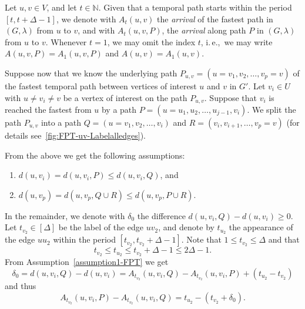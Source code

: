 \documentclass[a4paper,UKenglish,cleveref, autoref, thm-restate]{lipics-v2021}
\newcommand{\ie}{i.\,e.,\ }
\begin{document}
Let $u,v\in V$, and let $t\in \mathbb{N}$. 
Given that a temporal path starts within the period $[t,t+\Delta -1]$,
we denote with $A_{t}(u,v)$
the \emph{arrival} of the fastest path in $(G,\lambda )$ from $u$ to $v$, and
with $A_{t}(u,v,P)$,
the \emph{arrival} along path $P$ in $(G,\lambda )$ from $u$ to $v$.
%
Whenever $t=1$, we may omit the index $t$, \ie we may write 
$A(u,v,P)=A_{1}(u,v,P)$ and $A(u,v)=A_{1}(u,v)$. 

Suppose now that 
we know the underlying path $P_{u,v} = (u=v_1, v_2, \dots, v_p = v)$ of the fastest temporal path between vertices of interest $u$ and $v$ in $G'$.
Let $v_i\in U$ with $u\neq v_i \neq v$ be a vertex of interest on the path $P_{u,v}$.
Suppose that $v_i$ is reached the fastest from $u$ by a path $P = (u = u_1, u_2, \dots, u_{j-1}, v_i)$.
We split the path $P_{u,v}$ into a path $ Q = (u=v_1, v_2, \dots, v_i)$ and $R = (v_i, v_{i+1}, \dots, v_p=v)$
(for details see~\cref{fig:FPT-uv-Labelalledges}).

From the above we get the following assumptions:
	\begin{enumerate}
		\item \label{assumption1-FPT} $d(u,v_{i})=d(u,v_{i},P)\leq d(u,v_{i},Q)$, and
		\item \label{assumption2-FPT} $d(u,v_p)=d(u,v_p,Q\cup R)\leq d(u,v_p,P\cup R)$.
	\end{enumerate}
In the remainder, we denote with $\delta_{0}$ the difference $d(u,v_{i},Q) - d(u,v_{i})\geq 0$.
%
 Let $t_{v_2}\in [\Delta]$ be the label of the edge $uv_2$,
	and denote by $t_{u_{2}}$ the appearance of the edge $uu_{2}$ within the
	period $[t_{v_2},t_{v_2}+\Delta -1]$. Note that $1\leq t_{v_2}\leq
	\Delta $ and that 
 \begin{equation}
t_{v_{2}} \leq t_{u_{2}} \leq t_{v_{2}}+\Delta -1 \leq 2\Delta -1.
\label{basic-ineq-0}
\end{equation}
    From Assumption~\ref{assumption1-FPT} we get
	\begin{equation*}
		\delta
		_{0}=d(u,v_{i},Q)-d(u,v_{i})=A_{t_{v_2}}(u,v_{i},Q)-A_{t_{v_2}}(u,v_{i},P)+\left( t_{u_{2}}-t_{v_2}\right)
	\end{equation*}%
	and thus%
	\begin{equation}
		A_{t_{v_2}}(u,v_{i},P)-A_{t_{v_2}}(u,v_{i},Q)=t_{u_{2}}-(t_{v_2}+\delta _{0}).
		\label{basic-eq-1}
	\end{equation}
\end{document}
